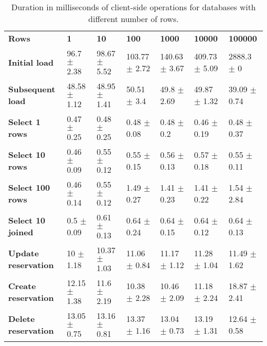 
\begin{table}[H]
\begin{adjustbox}{width=\textwidth}
\begin{tabular}{lllllll}
\textbf{Rows} & \textbf{1} & \textbf{10} & \textbf{100} & \textbf{1000} & \textbf{10000} & \textbf{100000} \\
\textbf{Initial load} & 96.7 $\pm$ 2.38 & 98.67 $\pm$ 5.52 & 103.77 $\pm$ 2.72 & 140.63 $\pm$ 3.67 & 409.73 $\pm$ 5.09 & 2888.3 $\pm$ 0\\
\textbf{Subsequent load} & 48.58 $\pm$ 1.12 & 48.95 $\pm$ 1.41 & 50.51 $\pm$ 3.4 & 49.8 $\pm$ 2.69 & 49.87 $\pm$ 1.32 & 39.09 $\pm$ 0.74\\
\textbf{Select 1 rows} & 0.47 $\pm$ 0.25 & 0.48 $\pm$ 0.25 & 0.48 $\pm$ 0.08 & 0.48 $\pm$ 0.2 & 0.46 $\pm$ 0.19 & 0.48 $\pm$ 0.37\\
\textbf{Select 10 rows} & 0.46 $\pm$ 0.09 & 0.55 $\pm$ 0.12 & 0.55 $\pm$ 0.15 & 0.56 $\pm$ 0.13 & 0.57 $\pm$ 0.18 & 0.55 $\pm$ 0.11\\
\textbf{Select 100 rows} & 0.46 $\pm$ 0.14 & 0.55 $\pm$ 0.12 & 1.49 $\pm$ 0.27 & 1.41 $\pm$ 0.23 & 1.41 $\pm$ 0.22 & 1.54 $\pm$ 2.84\\
\textbf{Select 10 joined} & 0.5 $\pm$ 0.09 & 0.61 $\pm$ 0.13 & 0.64 $\pm$ 0.24 & 0.64 $\pm$ 0.15 & 0.64 $\pm$ 0.12 & 0.64 $\pm$ 0.13\\
\textbf{Update reservation} & 10 $\pm$ 1.18 & 10.37 $\pm$ 1.03 & 11.06 $\pm$ 0.84 & 11.17 $\pm$ 1.12 & 11.28 $\pm$ 1.04 & 11.49 $\pm$ 1.62\\
\textbf{Create reservation} & 12.15 $\pm$ 1.38 & 11.6 $\pm$ 2.19 & 10.38 $\pm$ 2.28 & 10.46 $\pm$ 2.09 & 11.18 $\pm$ 2.24 & 18.87 $\pm$ 2.41\\
\textbf{Delete reservation} & 13.05 $\pm$ 0.75 & 13.16 $\pm$ 0.81 & 13.37 $\pm$ 1.16 & 13.04 $\pm$ 0.73 & 13.19 $\pm$ 1.31 & 12.64 $\pm$ 0.58
\end{tabular}
\end{adjustbox}
\caption{Duration in milliseconds of client-side operations for databases with different number of rows.}
\label{tab:client-experiment }
\end{table}
    
